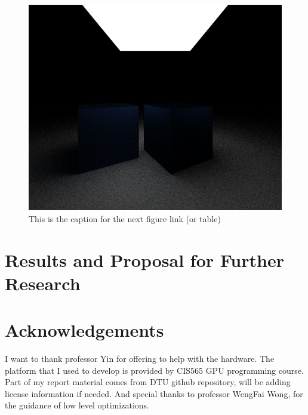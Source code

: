\documentclass[11pt]{article}
\begin{document}
\begin{figure}[htb]
\centering
\includegraphics[width=.9\linewidth]{./img/comparison.png}
\caption{\label{fig:orgparagraph1}
This is the caption for the next figure link (or table)}
\end{figure}
\section{Results and Proposal for Further Research}
\label{sec:orgheadline8}



\section{Acknowledgements}
\label{sec:orgheadline9}
I want to thank professor Yin for offering to help with the hardware. 
The platform  that I used to develop is provided by CIS565 GPU programming course. 
Part of my report material comes from DTU github repository, will be adding license information if needed.
And special thanks to professor WengFai Wong, for the guidance of low level optimizations. 
\end{document}
